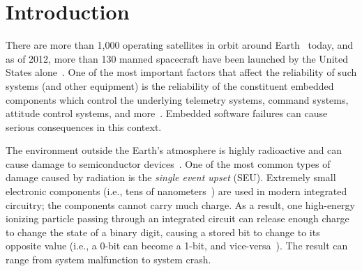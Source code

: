 \vspace{-35pt}
\section{Introduction}\label{sec:introduction}
\vspace{-10pt}
There are more than 1,000 operating satellites in orbit around Earth~\cite{satellite:total} today, and 
as of 2012, more than 130 manned spacecraft have been launched by the United States alone~\cite{space:shuttle:list}. 
One of the most important factors that affect the reliability of such systems 
(and other equipment) is the 
reliability of the constituent embedded components which control the underlying telemetry systems, command systems, attitude control systems, and more~\cite{fundamentals:space}. 
Embedded software failures can cause serious consequences in this context. 

The environment outside the Earth's atmosphere is highly radioactive 
and can cause damage to semiconductor devices~\cite{fundamentals:space}. One of the most common types of damage caused by radiation is the \textit{single event upset} (SEU). Extremely small electronic components (i.e., tens of nanometers~\cite{intel:chip:size}) are used in modern integrated circuitry; the components cannot carry much charge. As a result, one high-energy ionizing particle passing through an integrated circuit can release enough charge to change the state of a binary digit, causing a stored bit to change to its opposite value (i.e., a 0-bit can become a 1-bit, and vice-versa~\cite{fundamentals:space}). The
result can range from system malfunction to system crash.

